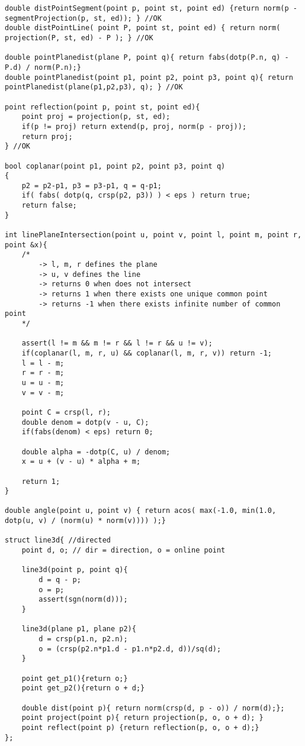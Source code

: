 \documentclass[10pt,a4paper,onesided]{article}
\begin{document}
\begin{multicols*}{3}
\begin{lstlisting}
double distPointSegment(point p, point st, point ed) {return norm(p - segmentProjection(p, st, ed)); } //OK
double distPointLine( point P, point st, point ed) { return norm( projection(P, st, ed) - P ); } //OK

double pointPlanedist(plane P, point q){ return fabs(dotp(P.n, q) - P.d) / norm(P.n);}
double pointPlanedist(point p1, point p2, point p3, point q){ return pointPlanedist(plane(p1,p2,p3), q); } //OK

point reflection(point p, point st, point ed){
    point proj = projection(p, st, ed);
    if(p != proj) return extend(p, proj, norm(p - proj));
    return proj;
} //OK

bool coplanar(point p1, point p2, point p3, point q)
{
    p2 = p2-p1, p3 = p3-p1, q = q-p1;
    if( fabs( dotp(q, crsp(p2, p3)) ) < eps ) return true;
    return false;
}

int linePlaneIntersection(point u, point v, point l, point m, point r, point &x){
    /*
        -> l, m, r defines the plane
        -> u, v defines the line
        -> returns 0 when does not intersect
        -> returns 1 when there exists one unique common point
        -> returns -1 when there exists infinite number of common point
    */

    assert(l != m && m != r && l != r && u != v);
    if(coplanar(l, m, r, u) && coplanar(l, m, r, v)) return -1;
    l = l - m;
    r = r - m;
    u = u - m;
    v = v - m;

    point C = crsp(l, r);
    double denom = dotp(v - u, C);
    if(fabs(denom) < eps) return 0;

    double alpha = -dotp(C, u) / denom;
    x = u + (v - u) * alpha + m;

    return 1;
}

double angle(point u, point v) { return acos( max(-1.0, min(1.0, dotp(u, v) / (norm(u) * norm(v)))) );}

struct line3d{ //directed
    point d, o; // dir = direction, o = online point

    line3d(point p, point q){
        d = q - p;
        o = p;
        assert(sgn(norm(d)));
    }

    line3d(plane p1, plane p2){
        d = crsp(p1.n, p2.n);
        o = (crsp(p2.n*p1.d - p1.n*p2.d, d))/sq(d);
    }

    point get_p1(){return o;}
    point get_p2(){return o + d;}

    double dist(point p){ return norm(crsp(d, p - o)) / norm(d);};
    point project(point p){ return projection(p, o, o + d); }
    point reflect(point p) {return reflection(p, o, o + d);}
};


\end{lstlisting}
\end{multicols*}
\end{document}
